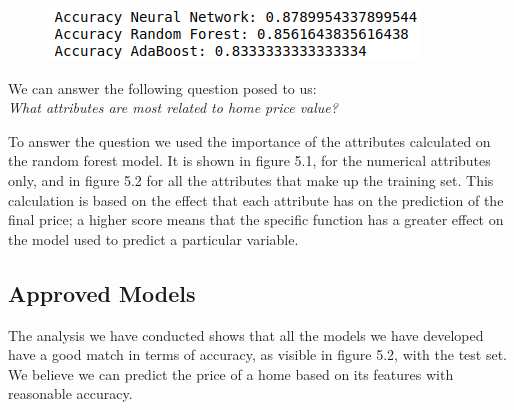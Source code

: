 \begin{figure}
\begin{center}
\begin{minipage}{.5\textwidth}
  \vspace{50pt}
  \includegraphics[width=0.7\linewidth]{imgs/accuracy_models.png}
\end{minipage}
\end{center}
\hrulefill\vspace{15pt}\par
\end{figure}

We can answer the following question posed to us:
\\
\emph{What attributes are most related to home price value?}

To answer the question we used the importance of the attributes calculated on the random forest model. It is shown in figure 5.1, for the numerical attributes only, and in figure 5.2 for all the attributes that make up the training set. This calculation is based on the effect that each attribute has on the prediction of the final price; a higher score means that the specific function has a greater effect on the model used to predict a particular variable. 

\subsection{Approved Models}

The analysis we have conducted shows that all the models we have developed have a good match in terms of accuracy, as visible in figure 5.2, with the test set. We believe we can predict the price of a home based on its features with reasonable accuracy. 

